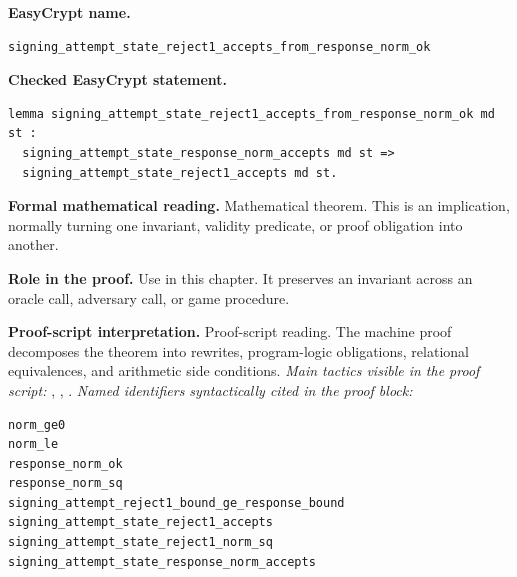 \begin{formaltheorem}
\noindent\textbf{EasyCrypt name.}
\begin{lstlisting}[language=EasyCrypt,basicstyle=\ttfamily\scriptsize]
signing_attempt_state_reject1_accepts_from_response_norm_ok
\end{lstlisting}
\noindent\textbf{Checked EasyCrypt statement.}
\begin{lstlisting}[language=EasyCrypt,basicstyle=\ttfamily\scriptsize]
lemma signing_attempt_state_reject1_accepts_from_response_norm_ok md st :
  signing_attempt_state_response_norm_accepts md st =>
  signing_attempt_state_reject1_accepts md st.
\end{lstlisting}
\noindent\textbf{Formal mathematical reading.}
Mathematical theorem. This is an implication, normally turning one invariant, validity predicate, or proof obligation into another.

\noindent\textbf{Role in the proof.}
Use in this chapter. It preserves an invariant across an oracle call, adversary call, or game procedure.

\noindent\textbf{Proof-script interpretation.}
Proof-script reading. The machine proof decomposes the theorem into rewrites, program-logic obligations, relational equivalences, and arithmetic side conditions.
\emph{Main tactics visible in the proof script:} , , .
\emph{Named identifiers syntactically cited in the proof block:}
\begin{lstlisting}[language=EasyCrypt,basicstyle=\ttfamily\scriptsize]
norm_ge0
norm_le
response_norm_ok
response_norm_sq
signing_attempt_reject1_bound_ge_response_bound
signing_attempt_state_reject1_accepts
signing_attempt_state_reject1_norm_sq
signing_attempt_state_response_norm_accepts
\end{lstlisting}

\end{formaltheorem}

